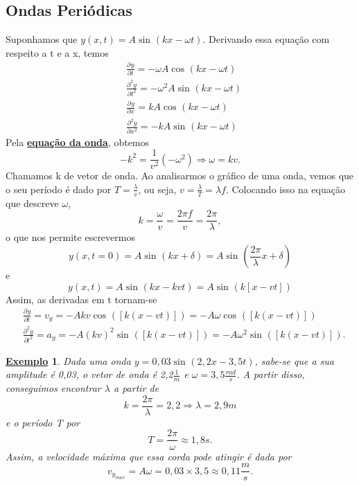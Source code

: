 \documentclass{article}
\newtheorem{example}{\underline{Exemplo}}
\begin{document}
\subsection{Ondas Periódicas}
  Suponhamos que \(y(x, t) = A\sin^{}{(kx - \omega t)}\). Derivando essa equação com respeito a t e a x, temos 
 \begin{align*}
   &\frac{\partial^{}y}{\partial t^{}} = -\omega A \cos^{}{(kx-\omega t)}\\
   &\frac{\partial^{2}y}{\partial t^{2}} = -\omega^{2}A \sin^{}{(kx-\omega t)}\\
   &\frac{\partial^{}y}{\partial x^{}} = k A \cos^{}{(kx-\omega t)}\\
   &\frac{\partial^{2}y}{\partial x^{2}} = -k A \sin^{}{(kx-\omega t)}
 \end{align*}
  Pela \hyperlink{wave_eqn}{\textbf{equação da onda}}, obtemos 
    \[
      -k^{2} = \frac{1}{v^{2}}(-\omega^{2}) \Rightarrow \omega = kv.
    \]
Chamamos k de vetor de onda. Ao analisarmos o gráfico de uma onda, vemos que o seu período
é dado por \(T = \frac{\lambda }{v}\), ou seja, \(v = \frac{\lambda }{T} = \lambda f\). Colocando isso na equação que descreve \(\omega \), 
  \[
    k = \frac{\omega }{v} = \frac{2\pi f}{v} = \frac{2\pi }{\lambda },
  \]
o que nos permite escrevermos 
  \[
    y(x, t=0) = A \sin^{}{(kx + \delta )} = A\sin^{}{(\frac{2\pi }{\lambda }x + \delta )}
  \]
e 
  \[
    y(x, t) = A \sin^{}{(kx-kvt)} = A\sin^{}{(k[x-vt])}
  \]
  Assim, as derivadas em t tornam-se 
 \begin{align*}
   &\frac{\partial^{}y}{\partial t^{}} = v_{y} = -Akv\cos^{}{([k(x-vt)])} = -A\omega \cos^{}{([k(x-vt)])}\\
   &\frac{\partial^{2}y}{\partial t^{2}} = a_{y} = -A(kv)^{2}\sin^{}{([k(x-vt)])} = -A\omega^{2}\sin^{}{([k(x-vt)])}.
 \end{align*}
\begin{example}
  Dada uma onda \(y = 0,03\sin^{}{(2,2x - 3,5t)}\), sabe-se que a sua amplitude é 0,03, o vetor de onda é 2,2\(\frac{1}{m}\) e \(\omega = 3,5\frac{rad}{s}\). A partir disso,
conseguimos encontrar \(\lambda \) a partir de 
  \[
    k = \frac{2\pi }{\lambda } = 2,2 \Rightarrow \lambda = 2,9m
  \]
e o período T por 
  \[
    T = \frac{2\pi }{\omega }\approx 1,8s.
  \]
Assim, a velocidade máxima que essa corda pode atingir é dada por 
  \[
    v_{y_{max}} = A\omega = 0,03\times 3,5\approx 0,11\frac{m}{s}.
  \]
\end{example}
\end{document}
